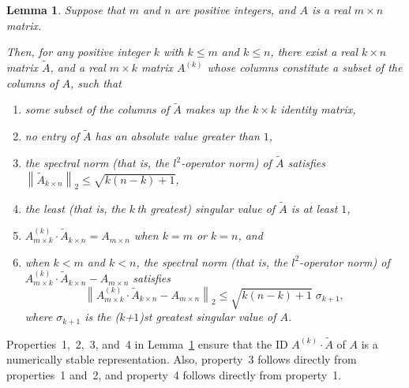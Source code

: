 \documentclass[final,3p,times]{elsarticle}
\newtheorem{lemma1}[theorem]{Lemma}
\newenvironment{lemma}{\begin{lemma1}}{\end{lemma1}}
\begin{document}
\begin{lemma}
\label{interpolation_lemma}
Suppose that $m$ and $n$ are positive integers,
and $A$ is a real $m \times n$ matrix.

Then, for any positive integer $k$ with $k \le m$ and $k \le n$,
there exist a real $k \times n$ matrix $\widetilde{A}$,
and a real $m \times k$ matrix $A^{(k)}$ whose columns constitute a subset
of the columns of $A$,
such that
\begin{enumerate}
\item some subset of the columns of $\widetilde{A}$ makes up
the $k \times k$ identity matrix,
\item no entry of $\widetilde{A}$ has an absolute value greater than $1$,
\item the spectral norm (that is, the $l^2$-operator norm) of $\widetilde{A}$
satisfies
$\left\| \widetilde{A}_{k \times n} \right\|_2 \le \sqrt{k (n-k) + 1}$,
\item the least (that is, the $k$\/\,th greatest) singular value
of $\widetilde{A}$ is at least $1$,
\item $A^{(k)}_{m \times k} \cdot \widetilde{A}_{k \times n} = A_{m \times n}$
when $k = m$ or $k = n$, and
\item when $k < m$ and $k < n$, the spectral norm
(that is, the $l^2$-operator norm)
of $A^{(k)}_{m \times k} \cdot \widetilde{A}_{k \times n} - A_{m \times n}$
satisfies
\begin{equation}
\left\| A^{(k)}_{m \times k} \cdot \widetilde{A}_{k \times n}
- A_{m \times n} \right\|_2 \le \sqrt{k (n-k) + 1} \; \sigma_{k+1},
\end{equation}
where $\sigma_{k+1}$ is the ($k$+$1$)st greatest singular value of $A$.
\end{enumerate}
\end{lemma}

Properties~1,~2,~3, and~4 in Lemma~\ref{interpolation_lemma}
ensure that the ID $A^{(k)} \cdot \widetilde{A}$
of $A$ is a numerically stable representation.
Also, property~3 follows directly from properties~1 and~2,
and property~4 follows directly from property~1.
\end{document}
